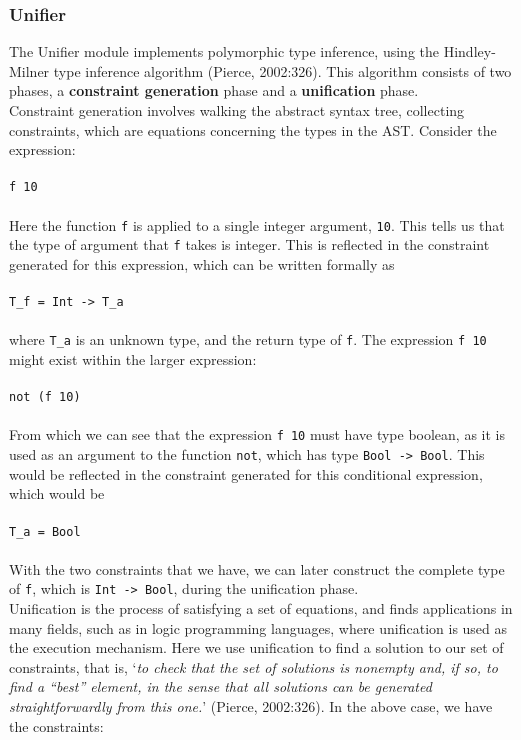 \documentclass{article}
\begin{document}
\subsubsection{Unifier}
The Unifier module implements polymorphic type inference, using the Hindley-Milner type inference algorithm (Pierce, 2002:326). This algorithm consists of two phases, a \textbf{constraint generation} phase and a \textbf{unification} phase.
\\\indent Constraint generation involves walking the abstract syntax tree, collecting constraints, which are equations concerning the types in the AST. Consider the expression:
\\\\
\indent \texttt{f 10}
\\\\
Here the function \texttt{f} is applied to a single integer argument, \texttt{10}. This tells us that the type of argument that \texttt{f} takes is integer. This is reflected in the constraint generated for this expression, which can be written formally as 
\\\\
\indent \texttt{T\_f = Int -> T\_a}
\\\\
where \texttt{T\_a} is an unknown type, and the return type of \texttt{f}. The expression \texttt{f 10} might exist within the larger expression:
\\\\
\indent \texttt{not (f 10)}
\\\\
From which we can see that the expression \texttt{f 10} must have type boolean, as it is used as an argument to the function \texttt{not}, which has type \texttt{Bool -> Bool}. This would be reflected in the constraint generated for this conditional expression, which would be
\\\\
\indent \texttt{T\_a = Bool}
\\\\
With the two constraints that we have, we can later construct the complete type of \texttt{f}, which is \texttt{Int -> Bool}, during the unification phase.
\\\indent Unification is the process of satisfying a set of equations, and finds applications in many fields, such as in logic programming languages, where unification is used as the execution mechanism. Here we use unification to find a solution to our set of constraints, that is, `\emph{to check that the set of solutions is nonempty and, if so, to find a ``best'' element, in the sense that all solutions can be generated straightforwardly from this one.}' (Pierce, 2002:326). In the above case, we have the constraints:
\end{document}
